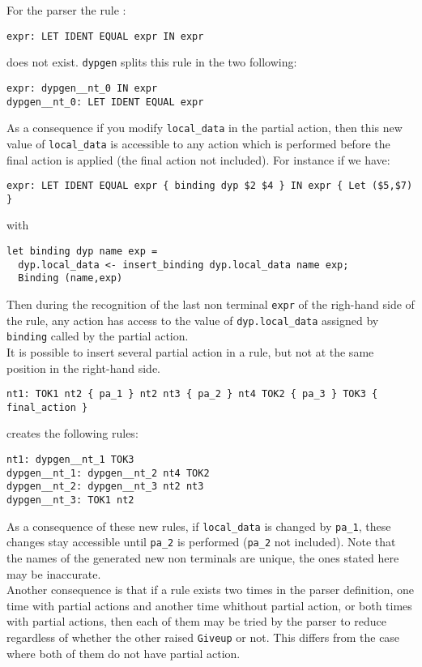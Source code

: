 \documentclass[12pt]{article}
\begin{document}
{For the parser the rule :
\begin{verbatim}
expr: LET IDENT EQUAL expr IN expr
\end{verbatim}
does not exist. \texttt{dypgen} splits this rule in the two following:
\begin{verbatim}
expr: dypgen__nt_0 IN expr
dypgen__nt_0: LET IDENT EQUAL expr
\end{verbatim}
As a consequence if you modify \texttt{local\_data} in the partial action, then this new value of \texttt{local\_data} is accessible to any action which is performed before the final action is applied (the final action not included). For instance if we have:
\begin{verbatim}
expr: LET IDENT EQUAL expr { binding dyp $2 $4 } IN expr { Let ($5,$7) }
\end{verbatim}
with
\begin{verbatim}
let binding dyp name exp =
  dyp.local_data <- insert_binding dyp.local_data name exp;
  Binding (name,exp)
\end{verbatim}
Then during the recognition of the last non terminal \texttt{expr} of the righ-hand side of the rule, any action has access to the value of \texttt{dyp.local\_data} assigned by \texttt{binding} called by the partial action.\\

It is possible to insert several partial action in a rule, but not at the same position in the right-hand side.
\begin{verbatim}
nt1: TOK1 nt2 { pa_1 } nt2 nt3 { pa_2 } nt4 TOK2 { pa_3 } TOK3 { final_action }
\end{verbatim}
creates the following rules:
\begin{verbatim}
nt1: dypgen__nt_1 TOK3
dypgen__nt_1: dypgen__nt_2 nt4 TOK2
dypgen__nt_2: dypgen__nt_3 nt2 nt3
dypgen__nt_3: TOK1 nt2
\end{verbatim}
As a consequence of these new rules, if \texttt{local\_data} is changed by \texttt{pa\_1}, these changes stay accessible until \texttt{pa\_2} is performed (\texttt{pa\_2} not included). Note that the names of the generated new non terminals are unique, the ones stated here may be inaccurate.\\

Another consequence is that if a rule exists two times in the parser definition, one time with partial actions and another time whithout partial action, or both times with partial actions, then each of them may be tried by the parser to reduce regardless of whether the other raised \texttt{Giveup} or not. This differs from the case where both of them do not have partial action.

}
\end{document}

